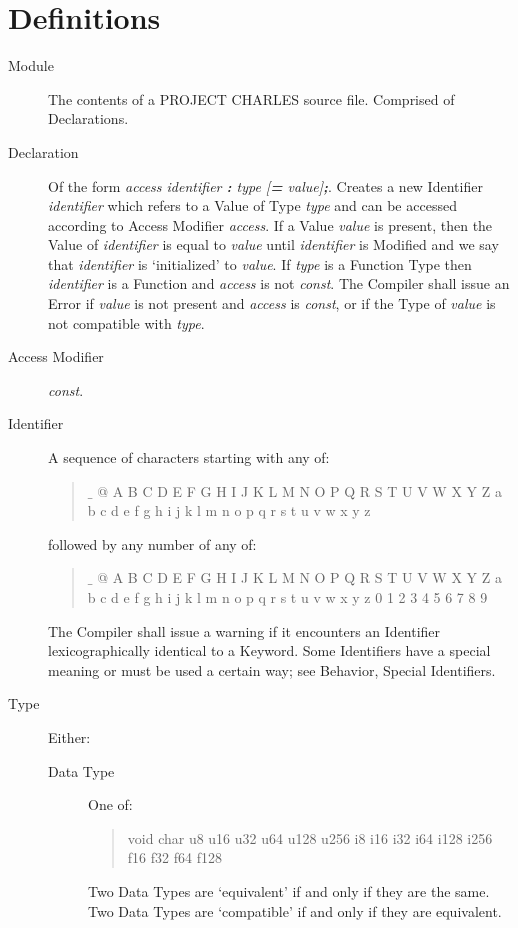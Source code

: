 \documentclass{article}
\begin{document}
\section{Definitions}
	\begin{description}
	\item[Module] The contents of a PROJECT CHARLES source file. Comprised of Declarations.
	\item[Declaration] Of the form \textit{access identifier \textbf{:} type [\textbf{=} value]\textbf{;}}. Creates a new Identifier \textit{identifier} which refers to a Value of Type \textit{type} and can be accessed according to Access Modifier \textit{access}. If a Value \textit{value} is present, then the Value of \textit{identifier} is equal to \textit{value} until \textit{identifier} is Modified and we say that \textit{identifier} is `initialized' to \textit{value}. If \textit{type} is a Function Type then \textit{identifier} is a Function and \textit{access} is not \textit{const}. The Compiler shall issue an Error if \textit{value} is not present and \textit{access} is \textit{const}, or if the Type of \textit{value} is not compatible with \textit{type}.
	\item[Access Modifier] \textit{const}.
	\item[Identifier] A sequence of characters starting with any of:
		\begin{quote}
		$\_$ @ A B C D E F G H I J K L M N O P Q R S T U V W X Y Z a b c d e f g h i j k l m n o p q r s t u v w x y z
		\end{quote}
		followed by any number of any of:
		\begin{quote}
		$\_$ @ A B C D E F G H I J K L M N O P Q R S T U V W X Y Z a b c d e f g h i j k l m n o p q r s t u v w x y z 0 1 2 3 4 5 6 7 8 9
		\end{quote}
		The Compiler shall issue a warning if it encounters an Identifier lexicographically identical to a Keyword. Some Identifiers have a special meaning or must be used a certain way; see Behavior, Special Identifiers.
	\item[Type] Either:
		\begin{description}
		\item[Data Type] One of:
			\begin{quote}
			void char u8 u16 u32 u64 u128 u256 i8 i16 i32 i64 i128 i256 f16 f32 f64 f128 
			\end{quote}
			Two Data Types are `equivalent' if and only if they are the same. Two Data Types are `compatible' if and only if they are equivalent.

\end{description}
\end{description}
\end{document}
